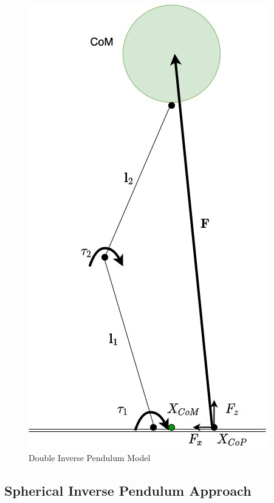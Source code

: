 \begin{figure}[h!]
    \centering
    \includegraphics[scale=0.45]{images/DIPM.jpg}\hfill
    \caption{Double Inverse Pendulum Model}\hfill
    \label{dipm}
\end{figure}


\subsection{Spherical Inverse Pendulum Approach}



